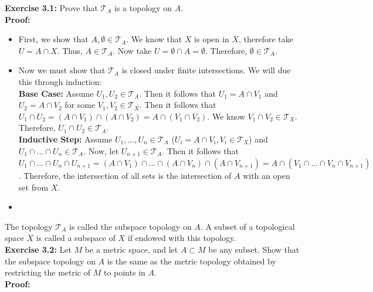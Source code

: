 \documentclass{article}
\begin{document}
\textbf{Exercise 3.1:} Prove that $\mathcal{T}_A$ is a topology on $A$.\\
\textbf{Proof:}
\begin{itemize}
    \item First, we show that $A,\emptyset\in \mathcal{T}_A$. We know that $X$ is open in $X$, therefore take $U=A\cap X$. Thus, $A\in \mathcal{T}_A$. Now take $U=\emptyset \cap A=\emptyset$. Therefore, $\emptyset \in \mathcal{T}_A$.
    \item Now we must show that $\mathcal{T}_A$ is closed under finite intersections. We will due this through induction:\\
    \textbf{Base Case:} Assume $U_1,U_2\in \mathcal{T}_A$. Then it follows that $U_1=A\cap V_1$ and $U_2=A\cap V_2$ for some $V_1,V_2\in\mathcal{T}_X$. Then it follows that $U_1\cap U_2=(A\cap V_1)\cap (A\cap V_2 )=A\cap (V_1\cap V_2 )$. We know $V_1\cap V_2 \in \mathcal{T}_X$. Therefore, $U_1\cap U_2\in\mathcal{T}_A$.\\
    \textbf{Inductive Step:} Assume $U_1,...,U_n\in\mathcal{T}_A$ ($U_i=A\cap V_i,V_i\in\mathcal{T}_X$) and $U_1\cap ...\cap U_n\in\mathcal{T}_A$. Now, let $U_{n+1}\in \mathcal{T}_A$. Then it follows that $U_1\cap...\cap U_n\cap U_{n+1}=(A\cap V_1)\cap...\cap (A\cap V_n)\cap (A\cap V_{n+1})=A\cap (V_1\cap...\cap V_n\cap V_{n+1})$. Therefore, the intersection of all sets is the intersection of $A$ with an open set from $X$.
    \item 
\end{itemize}
The topology $\mathcal{T}_A$ is called the subspace topology on $A$. A subset of a topological space $X$ is called a subspace of $X$ if endowed with this topology.\\
\textbf{Exercise 3.2:} Let $M$ be a metric space, and let $A\subset M$ be any subset. Show that the subspace topology on $A$ is the same as the metric topology obtained by restricting the metric of $M$ to points in $A$.\\
\textbf{Proof:}
\end{document}
